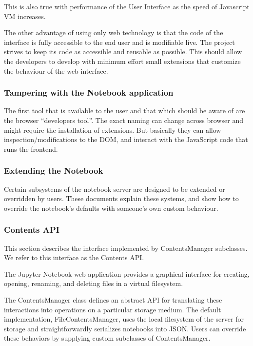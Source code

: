 This is also true with performance of the User Interface as the speed of Javascript VM increases. 

The other advantage of using only web technology is that the code of the interface is
fully accessible to the end user and is modifiable live. The project strives to keep its
code as accessible and reusable as possible. This should allow the developers to develop
with minimum effort small extensions that customize the behaviour of the web interface.

\subsubsection{Tampering with the Notebook application}

The first tool that is available to the user and that which should be aware of are the
browser ``developers tool''. The exact naming can change across browser and might require
the installation of extensions. But basically they can allow inspection/modifications to
the DOM, and interact with the JavaScript code that runs the frontend.

\subsubsection{Extending the Notebook}
Certain subsystems of the notebook server are designed to be extended or overridden by
users. These documents explain these systems, and show how to override the notebook's
defaults with someone's own custom behaviour.

\subsubsection{Contents API}
This section describes the interface implemented by ContentsManager subclasses. We refer
to this interface as the Contents API.

The Jupyter Notebook web application provides a graphical interface for creating, opening,
renaming, and deleting files in a virtual filesystem.

The ContentsManager class defines an abstract API for translating these interactions into
operations on a particular storage medium. The default implementation,
FileContentsManager, uses the local filesystem of the server for storage and
straightforwardly serializes notebooks into JSON. Users can override these behaviors by
supplying custom subclasses of ContentsManager.

